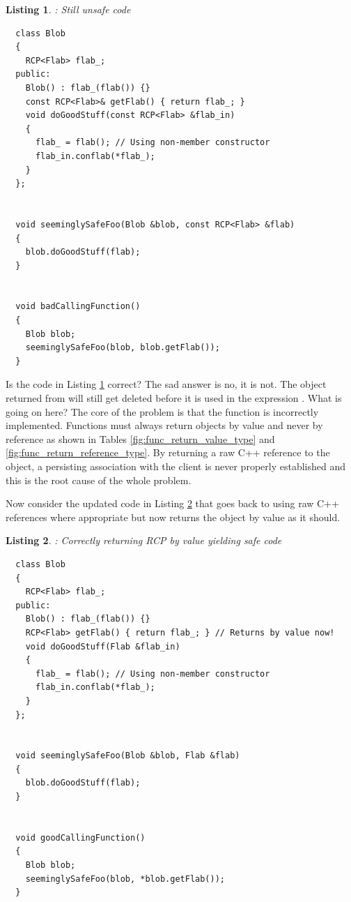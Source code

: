 \documentclass[pdf,ps2pdf,11pt]{SANDreport}
\newtheorem{listing}{Listing}
\begin{document}
\begin{listing}: Still unsafe code  \\
\label{listing:unsafe_raw_C++_reference3}
{\small\begin{verbatim}
  class Blob
  {
    RCP<Flab> flab_;
  public:
    Blob() : flab_(flab()) {}
    const RCP<Flab>& getFlab() { return flab_; }
    void doGoodStuff(const RCP<Flab> &flab_in)
    {
      flab_ = flab(); // Using non-member constructor
      flab_in.conflab(*flab_);
    }
  };


  void seeminglySafeFoo(Blob &blob, const RCP<Flab> &flab)
  {
    blob.doGoodStuff(flab);
  }


  void badCallingFunction()
  {
    Blob blob;
    seeminglySafeFoo(blob, blob.getFlab());
  }
\end{verbatim}}
\end{listing}

Is the code in Listing {}\ref{listing:unsafe_raw_C++_reference3}
correct?  The sad answer is no, it is not.  The {} object
returned from {} will still get deleted before it
is used in the expression {}.  What is
going on here?  The core of the problem is that the function
{} is incorrectly implemented.  Functions must
always return {} objects by value and never by reference as
shown in Tables {}\ref{fig:func_return_value_type} and
{}\ref{fig:func_return_reference_type}.  By returning a raw C++
reference to the {} object, a persisting association
with the client is never properly established and this is the root
cause of the whole problem.

Now consider the updated code in Listing
{}\ref{listing:safe_raw_C++_reference3} that goes back to using raw
C++ references where appropriate but now returns the
{} object by value as it should.

\begin{listing}: Correctly returning RCP by value yielding safe code \\
\label{listing:safe_raw_C++_reference3}
{\small\begin{verbatim}
  class Blob
  {
    RCP<Flab> flab_;
  public:
    Blob() : flab_(flab()) {}
    RCP<Flab> getFlab() { return flab_; } // Returns by value now!
    void doGoodStuff(Flab &flab_in)
    {
      flab_ = flab(); // Using non-member constructor
      flab_in.conflab(*flab_);
    }
  };


  void seeminglySafeFoo(Blob &blob, Flab &flab)
  {
    blob.doGoodStuff(flab);
  }


  void goodCallingFunction()
  {
    Blob blob;
    seeminglySafeFoo(blob, *blob.getFlab());
  }
\end{verbatim}}
\end{listing}
\end{document}
